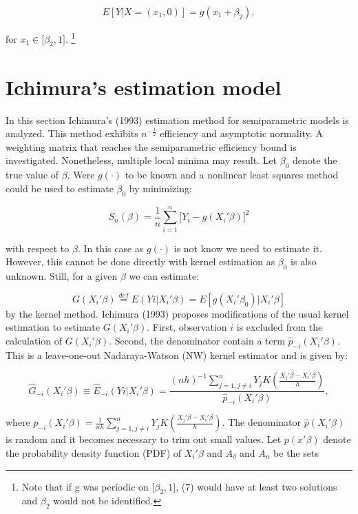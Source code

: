 \documentclass[a4paper]{article}
\begin{document}
\begin{equation}
E[Y| X = (x_1,0)] = g(x_1 + \beta_2),
\end{equation}

for $x_1 \in \big[\beta_2,1\big]$. \footnote{Note that if g was periodic on $\big[\beta_2,1\big]$, (7) would have at least two solutions and $\beta_2$ would not be identified.}


\section{Ichimura's estimation model} %
\label{sec:Ichimura's estimation model}

In this section Ichimura's (1993) estimation method for semiparametric models is analyzed. This method exhibits $n^{-\frac{1}{2}}$ efficiency and asymptotic normality. A weighting matrix that reaches the semiparametric efficiency bound is investigated. Nonetheless, multiple local minima may result. Let $\beta_0$ denote the true value of $\beta$. Were $g(\cdot)$ to be known and a nonlinear least squares method could be used to estimate $\beta_0$ by minimizing:

\begin{equation}
S_n(\beta) = \frac{1}{n}\sum_{i = 1}^n\big[Y_i - g(X_i'\beta)\big]^2
\end{equation}

with respect to $\beta$.
In this case as $g(\cdot)$ is not know we need to estimate it. However, this cannot be done directly with kernel estimation as $\beta_0$ is also unknown. Still, for a given $\beta$ we can estimate:

\begin{equation}
G(X_i'\beta) \stackrel{def}{=} E(Yi|X_i'\beta) = E[g(X_i'\beta_0)|X_i'\beta]
\end{equation}
 by the kernel method. Ichimura (1993) proposes modifications of the usual kernel estimation to estimate $G(X_i'\beta)$. First, observation $i$ is excluded from the calculation of $G(X_i'\beta)$. Second, the denominator contain a term $\hat{p}_{-i}(X_i'\beta)$. This is a leave-one-out Nadaraya-Watson (NW) kernel estimator and is given by:

\begin{equation}
\hat{G}_{-i}(X_i'\beta) \equiv \hat{E}_{-i}(Yi|X_i'\beta) = \frac{(nh)^{-1}\sum_{j=1, j \neq i }^{n}  Y_jK(\frac{X_j'\beta - X_i'\beta}{h})}{\hat{p}_{-i}(X_i'\beta)},
\end{equation}

where $\hat{p}_{-i}(X_i'\beta) = \frac{1}{nh}\sum_{j=1,j \neq i}^{n}Y_{j}K(\frac{X_j'\beta - X_i'\beta}{h})$.  The denominator $\hat{p}(X_i'\beta)$ is random and it becomes necessary to trim out small values. Let $p(x'\beta)$ denote the probability density function (PDF) of $X_i'\beta$ and $A_\delta$ and $A_n$ be the sets
\end{document}
